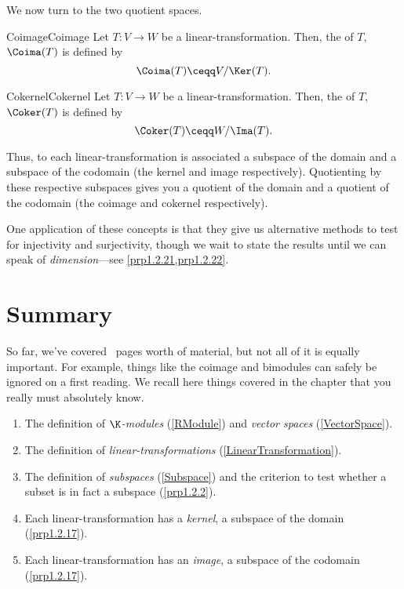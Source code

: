 We now turn to the two quotient spaces.
\begin{dfn}{Coimage}{Coimage}
	Let $T\colon V\rightarrow W$ be a linear-transformation.  Then, the  of $T$, $\Coima (T)$ is defined by
	\begin{equation}
	\Coima (T)\ceqq V/\Ker (T).
	\end{equation}
\end{dfn}
\begin{dfn}{Cokernel}{Cokernel}
	Let $T\colon V\rightarrow W$ be a linear-transformation.  Then, the  of $T$, $\Coker (T)$ is defined by
	\begin{equation}
	\Coker (T)\ceqq W/\Ima (T).
	\end{equation}
\end{dfn}
Thus, to each linear-transformation is associated a subspace of the domain and a subspace of the codomain (the kernel and image respectively).  Quotienting by these respective subspaces gives you a quotient of the domain and a quotient of the codomain (the coimage and cokernel respectively).

One application of these concepts is that they give us alternative methods to test for injectivity and surjectivity, though we wait to state the results until we can speak of \emph{dimension}---see \cref{prp1.2.21,prp1.2.22}.

\section{Summary}

So far, we've covered \thepage \ pages worth of material, but not all of it is equally important.  For example, things like the coimage and bimodules can safely be ignored on a first reading.  We recall here things covered in the chapter that you really must absolutely know.
\begin{enumerate}
	\item The definition of \emph{$\K$-modules} (\cref{RModule}) and \emph{vector spaces} (\cref{VectorSpace}).
	\item The definition of \emph{linear-transformations} (\cref{LinearTransformation}).
	\item The definition of \emph{subspaces} (\cref{Subspace}) and the criterion to test whether a subset is in fact a subspace (\cref{prp1.2.2}).
	\item Each linear-transformation has a \emph{kernel}, a subspace of the domain (\cref{prp1.2.17}).
	\item Each linear-transformation has an \emph{image}, a subspace of the codomain (\cref{prp1.2.17}).
\end{enumerate}
